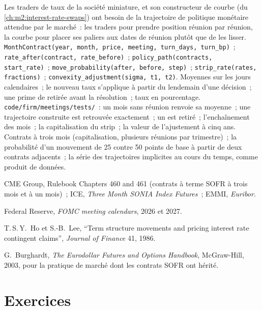 \begin{build}
 Les traders de taux de la société miniature, et son constructeur de courbe
(du \cref{ch:m2:interest-rate-swaps}) ont besoin de la trajectoire de politique monétaire attendue par le marché~:
les traders pour prendre position réunion par réunion, la courbe pour placer ses paliers
aux dates de réunion plutôt que de les lisser.  \texttt{MonthContract(year, month, price, meeting,
turn\_days, turn\_bp)}~; \texttt{rate\_after(contract, rate\_before)}~;
\texttt{policy\_path(contracts, start\_rate)}~;
\texttt{move\_probability(after, before, step)}~;
\texttt{strip\_rate(rates, fractions)}~;
\texttt{convexity\_adjustment(sigma, t1, t2)}.
 Moyennes sur les jours calendaires~; le nouveau taux s'applique à partir du lendemain
d'une décision~; une prime de  retirée avant la résolution~; taux en pourcentage.
 \texttt{code/firm/meetings/tests/}~: un mois sans réunion renvoie sa moyenne~; une
trajectoire construite est retrouvée exactement~; un  est retiré~;
l'enchaînement des mois~; la capitalisation du strip~; la valeur de l'ajustement
à cinq ans.
 Contrats à trois mois (capitalisation, plusieurs réunions par trimestre)~; la probabilité
d'un mouvement de 25 contre 50 points de base à partir de deux contrats adjacents~; la série
des trajectoires implicites au cours du temps, comme produit de données.
\end{build}

\begin{omsources}
\item CME Group, Rulebook Chapters 460 and 461 (contrats à terme SOFR à trois mois
et à un mois)~; ICE, \emph{Three Month SONIA Index Futures}~; EMMI, \emph{Euribor}.
\item Federal Reserve, \emph{FOMC meeting calendars}, 2026 et 2027.
\item T.\,S.\,Y.\ Ho et S.-B.\ Lee, ``Term structure movements and pricing
interest rate contingent claims'', \emph{Journal of Finance} 41, 1986.
\item G.\ Burghardt, \emph{The Eurodollar Futures and Options Handbook},
McGraw-Hill, 2003, pour la pratique de marché dont les contrats SOFR ont hérité.
\end{omsources}

\section{Exercices}

